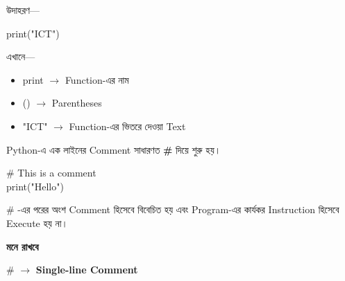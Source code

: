 উদাহরণ—

\begin{codebox}

\begin{english}
\ttfamily
print("ICT")
\end{english}

\end{codebox}

এখানে—

\begin{itemize}

\item
\textenglish{\ttfamily print}
\(\longrightarrow\)
Function-এর নাম

\item
\textenglish{\ttfamily ()}
\(\longrightarrow\)
Parentheses

\item
\textenglish{\ttfamily "ICT"}
\(\longrightarrow\)
Function-এর ভিতরে দেওয়া Text

\end{itemize}



Python-এ এক লাইনের Comment সাধারণত
\textbf{\textenglish{\ttfamily \#}}
দিয়ে শুরু হয়।

\begin{codebox}

\begin{english}
\ttfamily
\# This is a comment\\
print("Hello")
\end{english}

\end{codebox}

\textenglish{\ttfamily \#}
-এর পরের অংশ Comment হিসেবে বিবেচিত হয় এবং Program-এর
কার্যকর Instruction হিসেবে Execute হয় না।

\begin{rememberbox}

\textbf{\color{deepOrange}মনে রাখবে}

\begin{center}

\textenglish{\ttfamily \#}
\(\longrightarrow\)
\textbf{Single-line Comment}

\end{center}

\end{rememberbox}

